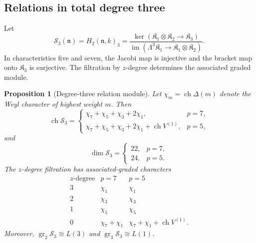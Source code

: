 \documentclass[11pt]{article}
\theoremstyle{plain}
\newtheorem{proposition}[proposition]{Proposition}
\theoremstyle{definition}
\theoremstyle{remark}
\numberwithin{equation}{section}
\newcommand{\kk}{k}
\newcommand{\Kalg}{\mathfrak K}
\newcommand{\im}{\operatorname{im}}
\newcommand{\gr}{\operatorname{gr}}
\newcommand{\Dlt}{\Delta}
\begin{document}
\subsection{Relations in total degree three}\label{sec:cubic}

Let
\[
 \mathcal S_3(\mathfrak n)
 =H_2(\mathfrak n,\kk)_3
 =\frac{\ker(\Kalg_1\otimes\Kalg_2\to\Kalg_3)}
 {\im(\Lambda^3\Kalg_1\to\Kalg_1\otimes\Kalg_2)}.
\]
In characteristics five and seven, the Jacobi map is injective and the bracket map onto
$\Kalg_3$ is surjective.  The filtration by $z$-degree determines the associated graded
module.

\begin{proposition}[Degree-three relation module]\label{prop:cubic-relations}
Let $\chi_m=\operatorname{ch}\Dlt(m)$ denote the Weyl character of highest weight $m$.
Then
\[
 \operatorname{ch}\mathcal S_3=
 \begin{cases}
  \chi_7+\chi_5+\chi_3+2\chi_1,&p=7,\\
  \chi_7+\chi_5+\chi_3+2\chi_1+\operatorname{ch}V^{(1)},&p=5,
 \end{cases}
\]
and
\[
 \dim\mathcal S_3=
 \begin{cases}
 22,&p=7,\\
 24,&p=5.
 \end{cases}
\]
The $z$-degree filtration has associated-graded characters
\begin{equation}\label{eq:cubic-zdegree-table}
\begin{array}{c|c|c}
\text{$z$-degree}&p=7&p=5\\ \hline
3&\chi_1&\chi_1\\
2&\chi_3&\chi_3\\
1&\chi_5&\chi_5\\
0&\chi_7+\chi_1&\chi_7+\chi_1+\operatorname{ch}V^{(1)}.
\end{array}
\end{equation}
Moreover,
$\gr_2\mathcal S_3\cong L(3)$ and $\gr_3\mathcal S_3\cong L(1)$.
\end{proposition}
\end{document}
